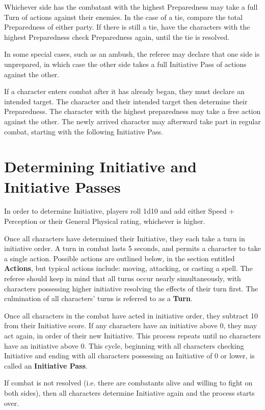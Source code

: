\documentclass[oneside]{book}
\begin{document}
\begin{multicols}{2}
Whichever side has the combatant with the highest Preparedness may take a full Turn of actions against their enemies. In the case of a tie, compare the total Preparedness of either party. If there is still a tie, have the characters with the highest Preparedness check Preparedness again, until the tie is resolved.

In some special cases, such as an ambush, the referee may declare that one side is unprepared, in which case the other side takes a full Initiative Pass of actions against the other. 

If a character enters combat after it has already began, they must declare an intended target. The character and their intended target then determine their Preparedness. The character with the highest preparedness may take a free action against the other. The newly arrived character may afterward take part in regular combat, starting with the following Initiative Pass.

\section{Determining Initiative and Initiative Passes}
In order to determine Initiative, players roll 1d10 and add either Speed + Perception or their General Physical rating, whichever is higher.

Once all characters have determined their Initiative, they each take a 
turn in initiative order. A turn in combat lasts 5 seconds, and permits a character to take a single action. Possible actions are outlined below, in the section entitled \textbf{Actions}, but typical actions include: moving, attacking, or casting a spell. The referee should keep in mind that all turns occur nearly simultaneously, with characters possessing higher initiative resolving the effects of their turn first. The culmination of all characters' turns is referred to as a \textbf{Turn}.

Once all characters in the combat have acted in initiative order, they subtract 10 from their Initiative score. If any characters have an initiative above 0, they may act again, in order of their new Initiative. This process repeats until no characters have an initiative  above 0. This cycle, beginning with all characters checking Initiative and ending with all characters possessing an Initiative of 0 or lower, is called an \textbf{Initiative Pass}.

If combat is not resolved (i.e. there are combatants alive and willing to fight on both sides), then all characters determine Initiative again and the process starts over. 


\end{multicols}
\end{document}
